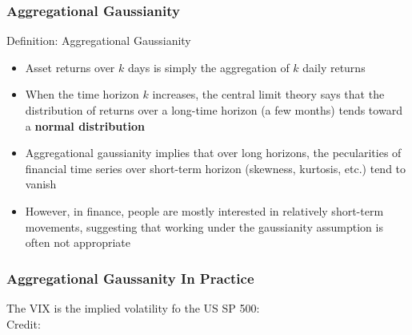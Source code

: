 \documentclass{beamer}
\begin{document}
\begin{frame}
  \frametitle{Aggregational Gaussianity}

  \begin{block}{Definition: Aggregational Gaussianity}
    \begin{itemize}
    \item Asset returns over $k$ days is simply the aggregation of $k$ daily returns
    \item When the time horizon $k$ increases, the central limit theory says that the distribution of returns over a long-time horizon (a few months) tends toward a \textbf{normal distribution}
    \end{itemize}
  \end{block}


  \begin{itemize}
  \item Aggregational gaussianity implies that over long horizons, the pecularities of financial time series over short-term horizon (skewness, kurtosis, etc.) tend to vanish
  \item However, in finance, people are mostly interested in relatively short-term movements, suggesting that working under the gaussianity assumption is often not appropriate
  \end{itemize}
  
\end{frame}


\begin{frame}
  \frametitle{Aggregational Gaussanity In Practice}
  The VIX is the implied volatility fo the US SP 500:\\ 
  \hspace*{15pt}\hbox{\scriptsize Credit:} 
\end{frame}
\end{document}
